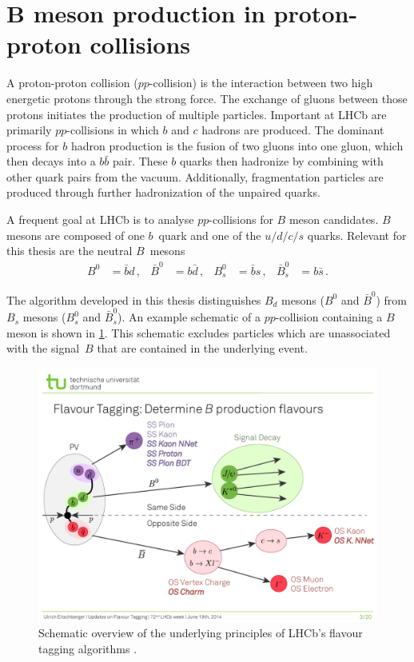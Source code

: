 \section[\texorpdfstring{$B$}{B} meson production in proton-proton collisions]{\texorpdfstring{$\symbf{B}$}{B} meson production in proton-proton collisions}
\label{sec:B_mesons}

A proton-proton collision ($pp$-collision) is the interaction between two high energetic protons through the strong force.
The exchange of gluons between those protons initiates the production of multiple particles. 
Important at LHCb are primarily $pp$-collisions in which $b$ and $c$ hadrons are produced.
The dominant process for $b$ hadron production is the fusion of two gluons into one gluon, which then decays into a $b\bar{b}$ pair.
These $b$ quarks then hadronize by combining with other quark pairs from the vacuum. 
Additionally, fragmentation particles are produced through further hadronization of the unpaired quarks.

A frequent goal at LHCb is to analyse $pp$-collisions for $B$ meson candidates. %
$B$ mesons are composed of one $b$~quark and one of the $u/d/c/s$ quarks.
Relevant for this thesis are the neutral $B$~mesons
\begin{align*}
    B^0 &= \bar{b}d \, , & \bar{B}^0 &= b\bar{d} \, , & B_s^0 &= \bar{b}s \, , & \bar{B}_s^0 &= b\bar{s} \, .
\end{align*}

The algorithm developed in this thesis distinguishes $B_d$ mesons ($B^0$ and $\bar{B}^0$) from $B_s$ mesons ($B_s^0$ and $\bar{B}_s^0$).
An example schematic of a $pp$-collision containing a $B$ meson is shown in \cref{fig:ft_scheme}. 
This schematic excludes particles which are unassociated with the signal~$B$ that are contained in the underlying event.

\begin{figure}
    \centering
    \includegraphics[width=\textwidth]{images/FlavourTaggingScheme.pdf}
    \caption{Schematic overview of the underlying principles of LHCb's flavour tagging algorithms \cite{ft_scheme}.}
    \label{fig:ft_scheme}
\end{figure}


